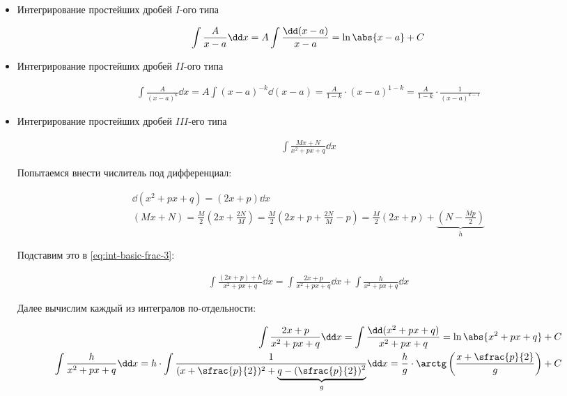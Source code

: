 \label{int-basic-frac}

\begin{itemize}
\item Интегрирование простейших дробей \(I\)-ого типа

\begin{align*}
  \int \frac{A}{x - a}\dd x
  = A \int \frac{\dd (x - a)}{x - a}
  = \ln \abs{x - a} + C
\end{align*}

\item Интегрирование простейших дробей \(II\)-ого типа

\begin{align*}
  \int \frac{A}{(x - a)^{k}}\dd x
  = A \int (x - a)^{-k} \dd (x - a)
  = \frac{A}{1 - k} \cdot (x - a)^{1 - k}
  =\frac{A}{1 - k} \cdot \frac{1}{(x - a)^{k - 1}}
\end{align*}

\item Интегрирование простейших дробей \(III\)-его типа

\begin{align}\label{eq:int-basic-frac-3}\tag{1}
  \int \frac{Mx + N}{x^2 + px + q} \dd x
\end{align}

Попытаемся внести числитель под дифференциал:

\begin{align*}
  \dd (x^2 + px + q) = (2x + p) \dd x \\
  (Mx + N)
  = \frac{M}{2} \left( 2x + \frac{2N}{M} \right)
  = \frac{M}{2} \left( 2x + p + \frac{2N}{M} - p \right)
  = \frac{M}{2} (2x + p) + \underbrace{\left( N - \frac{Mp}{2} \right)}_{h}
\end{align*}

Подставим это в \eqref{eq:int-basic-frac-3}:

\begin{align*}
  \int \frac{(2x + p) + h}{x^2 + px + q} \dd x =
  \int \frac{2x + p}{x^2 + px + q} \dd x + \int \frac{h}{x^2 + px + q} \dd x
\end{align*}

Далее вычислим каждый из интегралов по-отдельности:

\begin{align*}
  \int \frac{2x + p}{x^2 + px + q} \dd x =
  \int \frac{\dd (x^2 + px + q)}{x^2 + px + q} =
  \ln \abs{x^2 + px + q} + C
  \\
  \int \frac{h}{x^2 + px + q} \dd x =
  h \cdot \int \frac{1}{(x + \sfrac{p}{2})^2 +
    \underbrace{q - (\sfrac{p}{2})^2}_{g}
  } \dd x =
  \frac{h}{g} \cdot \arctg \left(\frac{x + \sfrac{p}{2}}{g}\right) + C
\end{align*}


\end{itemize}
